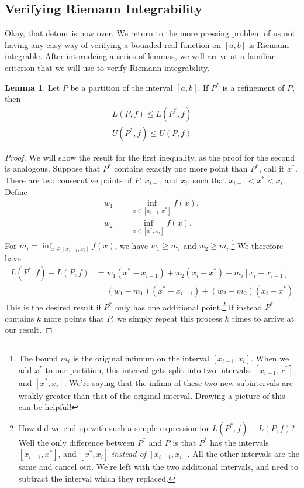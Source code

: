 \documentclass{article}
\theoremstyle{definition}
\newtheorem{lemma}{Lemma}[section]
\begin{document}
	\subsection{Verifying Riemann Integrability}
	Okay, that detour is now over. We return to the more pressing problem of us not having any easy way of verifying a bounded real function on $ [a,b] $ is Riemann integrable. After intorudcing a series of lemmas, we will arrive at a familiar criterion that we will use to verify Riemann integrability.
	\begin{lemma}
		Let $ P $ be a partition of the interval $ [a,b] $. If $ P^* $ is a refinement of $ P $, then\begin{align*}
			L(P,f)\le L(P^*,f)\\
			U(P^*,f)\le U(P,f)
		\end{align*} 
	\end{lemma}
	\begin{proof}
		We will show the result for the first inequality, as the proof for the second is analogous. Suppose that $ P^* $ contains exactly one more point than $ P^* $, call it $ x^* $. There are two consecutive points of $ P $, $ x_{i-1} $ and $ x_i $, such that $x_{i-1}<x^*<x_i $. Define 
		\begin{align*}
			w_1&=\inf\limits_{x\in[x_{i-1},x^*]}f(x),\\w_2&=\inf\limits_{x\in[x^*,x_i]}f(x).
		\end{align*}
		For $ m_i=\inf_{x\in[x_{i-1},x_i]}f(x) $, we have $ w_1\ge m_i $ and $ w_2\ge m_i $.\footnote{The bound $ m_i $ is the original infimum on the interval $ [x_{i-1},x_i] $. When we add $ x^* $ to our partition, this interval gets split into two intervals: $ [x_{i-1},x^*] $, and $ [x^*,x_i] $. We're saying that the infima of these two new subintervals are weakly greater than that of the original interval. Drawing a picture of this can be helpful!} We therefore have 
		\begin{align*}
			L(P^*,f)-L(P,f)&=w_1(x^*-x_{i-1})+w_2(x_i-x^*)-m_i[x_i-x_{i-1}]\\&=(w_1-m_1)(x^*-x_{i-1})+(w_2-m_2)(x_i-x^*)
		\end{align*}
		This is the desired result if $ P^* $ only has one additional point.\footnote{How did we end up with such a simple expression for $ L(P^*,f)-L(P,f) $? Well the only difference between $ P^* $ and $ P $ is that $ P^* $ has the intervals  $ [x_{i-1},x^*] $, and $ [x^*,x_i] $ \textit{instead of} $ [x_{i-1},x_i]  $. All the other intervals are the same and cancel out. We're left with the two additional intervals, and need to subtract the interval which they replaced.} If instead $ P^* $ contains $ k $ more points that $ P $, we simply repeat this process $ k $ times to arrive at our result.  
	\end{proof}
\end{document}
